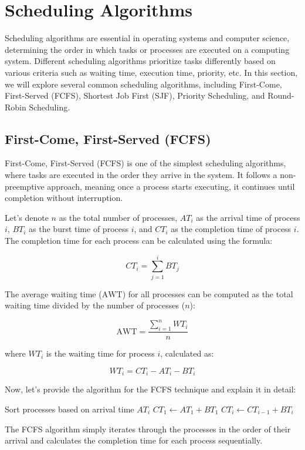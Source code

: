 \documentclass[12pt]{book} %
\begin{document}
\section{Scheduling Algorithms}

Scheduling algorithms are essential in operating systems and computer science, determining the order in which tasks or processes are executed on a computing system. Different scheduling algorithms prioritize tasks differently based on various criteria such as waiting time, execution time, priority, etc. In this section, we will explore several common scheduling algorithms, including First-Come, First-Served (FCFS), Shortest Job First (SJF), Priority Scheduling, and Round-Robin Scheduling.

\subsection{First-Come, First-Served (FCFS)}

First-Come, First-Served (FCFS) is one of the simplest scheduling algorithms, where tasks are executed in the order they arrive in the system. It follows a non-preemptive approach, meaning once a process starts executing, it continues until completion without interruption.

Let's denote $n$ as the total number of processes, $AT_i$ as the arrival time of process $i$, $BT_i$ as the burst time of process $i$, and $CT_i$ as the completion time of process $i$. The completion time for each process can be calculated using the formula:

\[
CT_i = \sum_{j=1}^{i} BT_j
\]

The average waiting time ($\text{AWT}$) for all processes can be computed as the total waiting time divided by the number of processes ($n$):

\[
\text{AWT} = \frac{\sum_{i=1}^{n} WT_i}{n}
\]

where $WT_i$ is the waiting time for process $i$, calculated as:

\[
WT_i = CT_i - AT_i - BT_i
\]

Now, let's provide the algorithm for the FCFS technique and explain it in detail:
\FloatBarrier
\begin{algorithm}[H]
\caption{First-Come, First-Served (FCFS) Scheduling}
\begin{algorithmic}[1]
\State Sort processes based on arrival time $AT_i$
\State $CT_1 \gets AT_1 + BT_1$
    \State $CT_i \gets CT_{i-1} + BT_i$
\EndFor
\end{algorithmic}
\end{algorithm}
\FloatBarrier
The FCFS algorithm simply iterates through the processes in the order of their arrival and calculates the completion time for each process sequentially.
\end{document}
